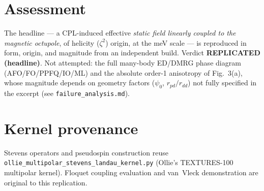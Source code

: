 \documentclass[aps,prb,twocolumn,superscriptaddress,floatfix]{revtex4-2}
\begin{document}
\section{Assessment}
The headline --- a CPL-induced effective \emph{static field linearly coupled to
the magnetic octupole}, of helicity ($\zeta^2$) origin, at the meV scale --- is
reproduced in form, origin, and magnitude from an independent build. Verdict
\textbf{REPLICATED (headline)}. Not attempted: the full many-body ED/DMRG phase
diagram (AFO/FO/PPFQ/IO/ML) and the absolute order-1 anisotropy of Fig.~3(a),
whose magnitude depends on geometry factors ($\psi_0$, $r_{pd}/r_{dd}$) not
fully specified in the excerpt (see \texttt{failure\_analysis.md}).

\section*{Kernel provenance}
Stevens operators and pseudospin construction reuse
\texttt{ollie\_multipolar\_stevens\_landau\_kernel.py} (Ollie's TEXTURES-100
multipolar kernel). Floquet coupling evaluation and van~Vleck demonstration are
original to this replication.
\end{document}
